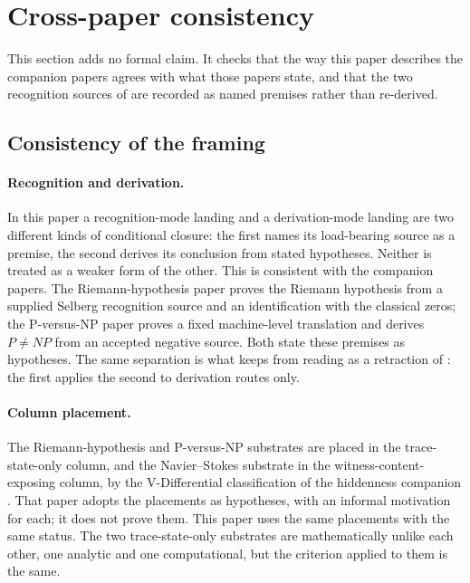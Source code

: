 \section{Cross-paper consistency}\label{sec:audit}

This section adds no formal claim.  It checks that the way this paper
describes the companion papers agrees with what those papers state,
and that the two recognition sources of  are
recorded as named premises rather than re-derived.

\subsection{Consistency of the framing}\label{sec:audit:cross-paper-consistency}

\paragraph{Recognition and derivation.}  In this paper a
recognition-mode landing and a derivation-mode landing are two
different kinds of conditional closure: the first names its
load-bearing source as a premise, the second derives its conclusion
from stated hypotheses.  Neither is treated as a weaker form of the
other.  This is consistent with the companion papers.  The
Riemann-hypothesis paper \cite{Tsiokos2026RH} proves the Riemann
hypothesis from a supplied Selberg recognition source and an
identification with the classical zeros; the P-versus-NP paper
\cite{Tsiokos2026PvNP} proves a fixed machine-level translation and
derives \(P\neq NP\) from an accepted negative source.  Both state these
premises as hypotheses.  The same separation is what keeps
 from reading as a retraction of
: the first applies the second to
derivation routes only.

\paragraph{Column placement.}  The Riemann-hypothesis and P-versus-NP
substrates are placed in the trace-state-only column, and the
Navier--Stokes substrate in the witness-content-exposing column, by the
V-Differential classification of the hiddenness companion
\cite{Tsiokos2026CSL}.  That paper adopts the placements as
hypotheses, with an informal motivation for each; it does not prove
them.  This paper uses the same placements with the same status.  The
two trace-state-only substrates are mathematically unlike each other,
one analytic and one computational, but the criterion applied to them
is the same.

